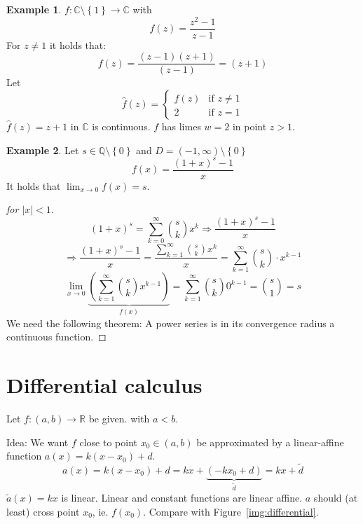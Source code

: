 \documentclass[a4paper,landscape,twocolumn]{article}
\theoremstyle{definition}
\newtheorem{ex}{Example}
\newcommand\set[1]{\left\{#1\right\}}
\newcommand\abs[1]{\left|#1\right|}
\begin{document}
\begin{ex}
  $f: \mathbb C \setminus \set{1} \to \mathbb C$ with
  \[ f(z) = \frac{z^2 - 1}{z - 1} \]
  For $z \neq 1$ it holds that:
  \[ f(z) = \frac{(z - 1)(z + 1)}{(z - 1)} = (z + 1) \]
  Let
  \[
    \hat{f}(z) = \begin{cases}
      f(z) & \text{if } z \neq 1 \\
      2 & \text{if } z = 1
    \end{cases}
  \]
  $\hat{f}(z) = z + 1$ in $\mathbb C$ is continuous.
  $f$ has limes $w = 2$ in point $z > 1$.
\end{ex}
\begin{ex}
  Let $s \in \mathbb Q \setminus \set{0}$ and $D = (-1, \infty) \setminus \set{0}$
  \[ f(x) = \frac{(1 + x)^s - 1}{x} \]
  It holds that $\lim_{x \to 0} f(x) = s$.
  \begin{proof}[for $\abs{x} < 1$]
    \[ (1 + x)^s = \sum_{k = 0}^\infty \binom sk x^k \Rightarrow \frac{(1 + x)^s - 1}{x} \]
    \[
      \Rightarrow \frac{(1 + x)^s - 1}{x}
      = \frac{\sum_{k=1}^\infty \binom sk x^k}{x}
      = \sum_{k=1}^\infty \binom sk \cdot x^{k-1}
    \] \[
      \lim_{x \to 0} \underbrace{\left(
        \sum_{k=1}^\infty \binom sk x^{k-1}
      \right)}_{f(x)}
      = \sum_{k=1}^\infty \binom sk 0^{k-1}
      = \binom s1 = s
    \]
    We need the following theorem: A power series is in its convergence
    radius a continuous function.
  \end{proof}
\end{ex}

\section{Differential calculus}
%
Let $f: (a, b) \to \mathbb R$ be given. with $a < b$.

Idea: We want $f$ close to point $x_0 \in (a, b)$
be approximated by a linear-affine function $a(x) = k(x - x_0) + d$.
%
\[ a(x) = k (x - x_0) + d = kx + \underbrace{(-kx_0 + d)}_{\tilde d} = kx + \tilde d \]
$\tilde a(x) = kx$ is linear. Linear and constant functions are linear affine.
$a$ should (at least) cross point $x_0$, ie. $f(x_0)$. Compare with Figure~\ref{img:differential}.
\end{document}
